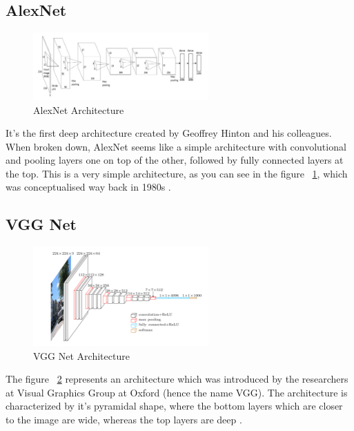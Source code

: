 \subsection[AlexNet]{AlexNet}

\begin{figure}[H]
\centering
\includegraphics[width=0.6\textwidth]{./figures/Alexnet}
\caption{AlexNet Architecture \cite{advances-architectures}}
\label{fig:alexnet}
\end{figure}

It's the first deep architecture created by Geoffrey Hinton and his colleagues. When broken down, AlexNet seems like a simple architecture with convolutional and pooling layers one on top of the other, followed by fully connected layers at the top. This is a very simple architecture, as you can see in the figure ~\ref{fig:alexnet}, which was conceptualised way back in 1980s  \cite{advances-architectures}.

\subsection[VGG Net]{VGG Net}

\begin{figure}[H]
\centering
\includegraphics[width=0.6\textwidth]{./figures/VGGNet}
\caption{VGG Net Architecture \cite{advances-architectures}}
\label{fig:vgg}
\end{figure}
The figure ~\ref{fig:vgg} represents an architecture which was introduced by the researchers at Visual Graphics Group at Oxford (hence the name VGG).
The architecture is characterized by it's pyramidal shape, where the bottom layers which are closer to the image are wide, whereas the top layers are deep \cite{advances-architectures}.


